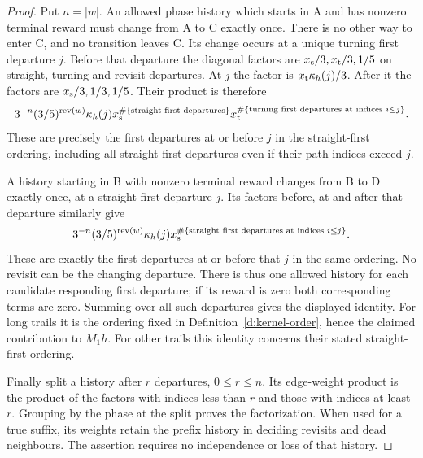 \begin{proof}
Put \(n=|w|\). An allowed phase history which starts in A and
has nonzero terminal reward must change from A to C exactly once.
There is no other way to enter C, and no transition leaves C.
Its change occurs at a unique turning first departure \(j\).
Before that departure the diagonal factors are
\(x_{\rm s}/3,x_{\rm t}/3,1/5\) on straight, turning and revisit
departures. At \(j\) the factor is
\(x_{\rm t}\kappa_h(j)/3\). After it the factors are
\(x_{\rm s}/3,1/3,1/5\). Their product is therefore
\[
 3^{-n}(3/5)^{\operatorname{rev}(w)}\kappa_h(j)
 x_{\rm s}^{\#\{\text{straight first departures}\}}
 x_{\rm t}^{\#\{\text{turning first departures at indices }i\le j\}}.
\]
These are precisely the first departures at or before \(j\) in
the straight-first ordering, including all straight first departures
even if their path indices exceed \(j\).

A history starting in B with nonzero terminal reward changes from
B to D exactly once, at a straight first departure \(j\). Its
factors before, at and after that departure similarly give
\[
 3^{-n}(3/5)^{\operatorname{rev}(w)}\kappa_h(j)
 x_{\rm s}^{\#\{\text{straight first departures at indices }i\le j\}}.
\]
These are exactly the first departures at or before that \(j\) in
the same ordering. No revisit can be the changing departure.
There is thus one allowed history for each candidate responding
first departure; if its reward is zero both corresponding terms
are zero. Summing over all such departures gives the displayed
identity. For long trails it is the ordering fixed in
Definition~\ref{d:kernel-order}, hence the claimed contribution
to \(M_1h\). For other trails this identity concerns their stated
straight-first ordering.

Finally split a history after \(r\) departures, \(0\le r\le n\).
Its edge-weight product is the product of the factors with indices
less than \(r\) and those with indices at least \(r\).
Grouping by the phase at the split proves the factorization.
When used for a true suffix, its weights retain the prefix history
in deciding revisits and dead neighbours. The assertion requires
no independence or loss of that history.
\end{proof}

